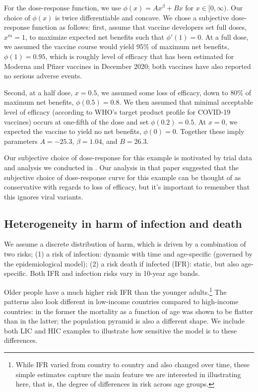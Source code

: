\documentclass[12pt]{article}
\begin{document}
For the dose-response function, we use $\phi(x) = Ax^\beta + Bx$ for $x \in [0,\infty)$. Our choice of $\phi(x)$ is twice differentiable and concave. We chose a subjective dose-response function as follows: first, assume that vaccine developers set full doses, $x^m=1$, to maximize expected net benefits such that $\phi'(1)=0$. At a full dose, we assumed the vaccine course would yield 95\% of maximum net benefits, $\phi(1)=0.95$, which is roughly level of efficacy that has been estimated for Moderna and Pfizer vaccines in December 2020; both vaccines have also reported no serious adverse events.

Second, at a half dose, $x=0.5$, we assumed some loss of efficacy, down to 80\% of maximum net benefits, $\phi(0.5)=0.8$. We then assumed that minimal acceptable level of efficacy (according to WHO's target product profile for COVID-19 vaccines) occurs at one-fifth of the dose and set $\phi(0.2) = 0.5$. At $x=0$, we expected the vaccine to yield no net benefits, $\phi(0)=0$.  Together these imply parameters $A=-25.3$, $\beta = 1.04$, and $B=26.3$. 

Our subjective choice of dose-response for this example is motivated by trial data and analysis we conducted in \cite{wiecek_pnas_2021}. Our analysis in that paper suggested that the subjective choice of dose-response curve for this example can be thought of as conservative with regards to loss of efficacy, but it's important to remember that this ignores viral variants.



\subsection{Heterogeneity in harm of infection and death}

We assume a discrete distribution of harm, which is driven by a combination of two risks; (1) a risk of infection: dynamic with time and age-specific (governed by the epidemiological model); (2) a risk death if infected (IFR): static, but also age-specific. Both IFR and infection risks vary in 10-year age bands. 



Older people have a much higher risk IFR than the younger adults.\footnote{While IFR varied from country to country and also changed over time, these simple estimates capture the main feature we are interested in illustrating here, that is, the degree of differences in risk across age groups.} The patterns also look different in low-income countries compared to high-income countries: in the former the mortality as a function of age was shown to be flatter than in the latter; the population pyramid is also a different shape. We include both LIC and HIC examples to illustrate how sensitive the model is to these differences.
\end{document}

